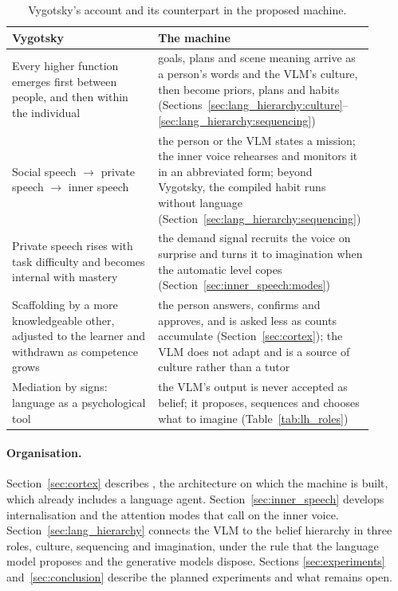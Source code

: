 \begin{table}[ht]
    \centering
    \small
    \begin{tabular}{|>{\raggedright\arraybackslash}p{0.4\linewidth}|>{\raggedright\arraybackslash}p{0.5\linewidth}|}
        \hline
        \textbf{Vygotsky} & \textbf{The machine} \\ \hline
        Every higher function emerges first between people, and then within the individual
            & goals, plans and scene meaning arrive as a person's words and the VLM's culture, then become priors,
              plans and habits (Sections~\ref{sec:lang_hierarchy:culture}--\ref{sec:lang_hierarchy:sequencing}) \\ \hline
        Social speech $\to$ private speech $\to$ inner speech
            & the person or the VLM states a mission; the inner voice rehearses and monitors it in an abbreviated
              form; beyond Vygotsky, the compiled habit runs without language (Section~\ref{sec:lang_hierarchy:sequencing}) \\ \hline
        Private speech rises with task difficulty and becomes internal with mastery \cite{berk1992children}
            & the demand signal recruits the voice on surprise and turns it to imagination when the automatic level
              copes
              (Section~\ref{sec:inner_speech:modes}) \\ \hline
        Scaffolding by a more knowledgeable other, adjusted to the learner and withdrawn as competence grows
        \cite{wood1976role}
            & the person answers, confirms and approves, and is asked less as counts accumulate (Section~\ref{sec:cortex}); the VLM does
              not adapt and is a source of culture rather than a tutor \\ \hline
        Mediation by signs: language as a psychological tool
            & the VLM's output is never accepted as belief; it proposes, sequences and chooses what to imagine
              (Table~\ref{tab:lh_roles}) \\ \hline
    \end{tabular}
    \caption{Vygotsky's account and its counterpart in the proposed machine.}
    \label{tab:vygotskian_mapping}
\end{table}

\paragraph{Organisation.}
Section~\ref{sec:cortex} describes \cortex{}, the architecture on which the machine is built, which already includes a
language agent. Section~\ref{sec:inner_speech} develops internalisation and the attention modes that call on the inner
voice. Section~\ref{sec:lang_hierarchy} connects the VLM to the belief hierarchy in three roles, culture, sequencing
and imagination, under the rule that the language model proposes and the generative models dispose. Sections
\ref{sec:experiments} and~\ref{sec:conclusion} describe the planned experiments and what remains open.

